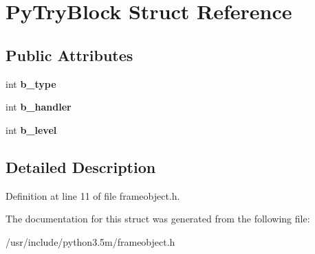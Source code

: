 \hypertarget{structPyTryBlock}{}\section{Py\+Try\+Block Struct Reference}
\label{structPyTryBlock}
\subsection*{Public Attributes}
\begin{DoxyCompactItemize}
\item 
int {\bfseries b\+\_\+type}\hypertarget{structPyTryBlock_aa418848c5fe8697d30b6e77bcb6f27e9}{}\label{structPyTryBlock_aa418848c5fe8697d30b6e77bcb6f27e9}

\item 
int {\bfseries b\+\_\+handler}\hypertarget{structPyTryBlock_a6c044684e86321ee19c9e283415d98d7}{}\label{structPyTryBlock_a6c044684e86321ee19c9e283415d98d7}

\item 
int {\bfseries b\+\_\+level}\hypertarget{structPyTryBlock_af72df02b69c40e42ff37aac22aab2ff3}{}\label{structPyTryBlock_af72df02b69c40e42ff37aac22aab2ff3}

\end{DoxyCompactItemize}


\subsection{Detailed Description}


Definition at line 11 of file frameobject.\+h.



The documentation for this struct was generated from the following file\+:\begin{DoxyCompactItemize}
\item 
/usr/include/python3.\+5m/frameobject.\+h\end{DoxyCompactItemize}

